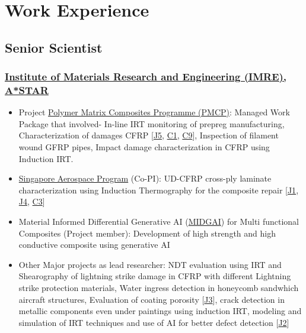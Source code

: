 \documentclass{my_cv}%
\begin{document}
\section{Work Experience}
\vspace{1.0em}
\subsection{Senior Scientist}
\subsubsection{\href{https://www.a-star.edu.sg/imre}{Institute of Materials Research and Engineering (IMRE), A*STAR}}
\hypersetup{
    colorlinks=true, %
    linkcolor=mypink, %
    urlcolor=blue,   %
    citecolor=black  %
}
\begin{itemize}[leftmargin=0.15in]
\setlength\itemsep{-0.1em}
\color{mygray}
\item Project \href{https://www.a-star.edu.sg/imre/news-and-highlights/highlights/media/polymer-matrix-composites-programme-(pmcp)}{Polymer Matrix Composites Programme (PMCP)}: Managed Work Package that involved- In-line IRT monitoring of prepreg manufacturing, Characterization of damages CFRP [\textcolor{mypink}{\hyperref[J5]{J5}}, \textcolor{mypink}{\hyperref[C1]{C1}}, \textcolor{mypink}{\hyperref[C9]{C9}}], Inspection of filament wound GFRP pipes, Impact damage characterization in CFRP using Induction IRT.
\item \href{https://www.a-star.edu.sg/aerospace}{Singapore Aerospace Program} (Co-PI): UD-CFRP cross-ply laminate characterization using Induction Thermography for the composite repair [\textcolor{mypink}{\hyperref[J1]{J1}}, \textcolor{mypink}{\hyperref[J4]{J4}}, \textcolor{mypink}{\hyperref[C3]{C3}}]
\item Material Informed Differential Generative AI (\href{https://aisingapore.org/design-beyond-what-you-know-material-informed-differential-generative-ai-midgai-for-light-weight-high-entropy-alloys-and-multi-functional-composites/}{MIDGAI}) for Multi functional Composites (Project member): Development of high strength and high conductive composite using generative AI
\item Other Major projects as lead researcher: NDT evaluation using IRT and Shearography of lightning strike damage in CFRP with different Lightning strike protection materials, Water ingress detection in honeycomb sandwhich aircraft structures, Evaluation of coating porosity [\textcolor{mypink}{\hyperref[J3]{J3}}], crack detection in metallic components even under paintings using induction IRT, modeling and simulation of IRT techniques and use of AI for better defect detection [\textcolor{mypink}{\hyperref[J2]{J2}}]
\end{itemize}%
\end{document}
